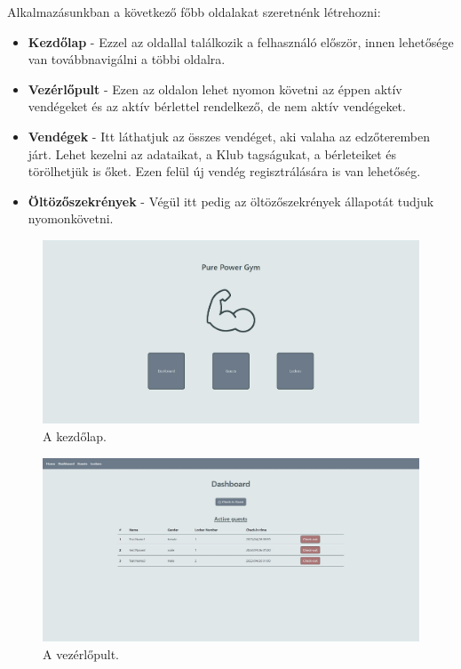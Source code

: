 \documentclass[12pt]{article}
\begin{document}
Alkalmazásunkban a következő főbb oldalakat szeretnénk létrehozni:
\begin{itemize}
	\item[]\textbf{Kezdőlap}
	- Ezzel az oldallal találkozik a felhasználó először, innen lehetősége van továbbnavigálni a többi oldalra.
	\item[]\textbf{Vezérlőpult}
	- Ezen az oldalon lehet nyomon követni az éppen aktív vendégeket és az aktív bérlettel rendelkező, de nem aktív vendégeket.
	\item[]\textbf{Vendégek}
	- Itt láthatjuk az összes vendéget, aki valaha az edzőteremben járt. Lehet kezelni az adataikat, a Klub tagságukat, a bérleteiket és törölhetjük is őket. Ezen felül új vendég regisztrálására is van lehetőség.
	\item[]\textbf{Öltözőszekrények}
	- Végül itt pedig az öltözőszekrények állapotát tudjuk nyomonkövetni.
\end{itemize}
\begin{figure}[h!]
	\includegraphics[width=\textwidth]{landing-page}
	\caption{A kezdőlap. }
\end{figure}
\begin{figure}[h!]
	\includegraphics[width=\textwidth]{dashboard-page}
	\caption{A vezérlőpult. }
\end{figure}
\end{document}
